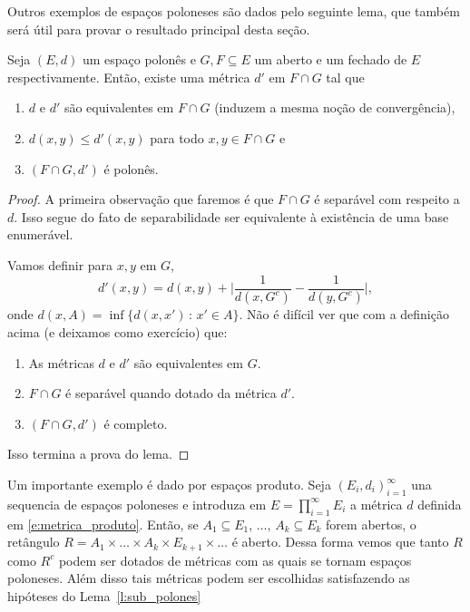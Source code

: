 Outros exemplos de espaços poloneses são dados pelo seguinte lema, que também será útil para provar o resultado principal desta seção.

\begin{lemma}
  \label{l:sub_polones}
  Seja $(E,d)$ um espaço polonês e $G, F \subseteq E$ um aberto e um fechado de $E$ respectivamente.
  Então, existe uma métrica $d'$ em $F \cap G$ tal que
  \begin{enumerate}[\quad a)]
  \item $d$ e $d'$ são equivalentes em $F \cap G$ (induzem a mesma noção de convergência),
  \item $d(x,y) \leq d'(x,y)$ para todo $x, y \in F \cap G$ e
  \item $(F \cap G, d')$ é polonês.
  \end{enumerate}
\end{lemma}

\begin{proof}
  A primeira observação que faremos é que $F \cap G$ é separável com respeito a $d$.
  Isso segue do fato de separabilidade ser equivalente à existência de uma base enumerável.

  Vamos definir para $x, y$ em $G$,
  \begin{equation}
    d'(x,y) = d(x,y) + \Big| \frac{1}{d(x,G^c)} - \frac{1}{d(y,G^c)} \Big|,
  \end{equation}
  onde $d(x,A) = \inf\{d(x,x')\, : \, x' \in A\}$.
Não é difícil ver que com a definição acima (e deixamos como exercício) que:
  \begin{enumerate}[\quad a)]
  \item As métricas $d$ e $d'$ são equivalentes em $G$.
  \item $F \cap G$ é separável quando dotado da métrica $d'$.
  \item $(F \cap G, d')$ é completo.
  \end{enumerate}
  Isso termina a prova do lema.
\end{proof}

\begin{example}
  Um importante exemplo é dado por espaços produto.
  Seja $(E_i, d_i)_{i=1}^\infty$ una sequencia de espaços poloneses e introduza em 
  $E = \prod_{i=1}^{\infty} E_i$ a métrica $d$ definida em \eqref{e:metrica_produto}.
  Então, se $A_1 \subseteq E_1$, $\dots$, $A_k \subseteq E_k$ forem abertos, o retângulo $R = A_1 \times \dots \times A_k \times E_{k+1} \times \dots$ é aberto.
  Dessa forma vemos que tanto $R$ como $R^c$ podem ser dotados de métricas com as quais se tornam espaços poloneses.
  Além disso tais métricas podem ser escolhidas satisfazendo as hipóteses do Lema~\ref{l:sub_polones}
\end{example}

